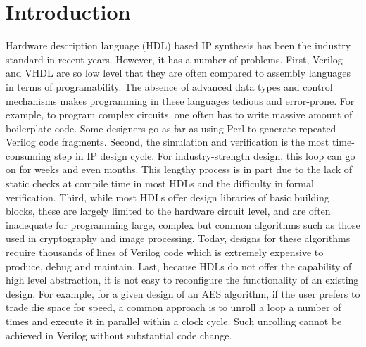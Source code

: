 \section{Introduction}\label{sec:intro}
Hardware description language (HDL)\cite{intro:HDL} based IP synthesis has been the
industry standard in recent years.
However, it has a number of problems.
First, Verilog and VHDL are so low level that they are often compared to assembly languages
in terms of programability. The absence of advanced data types and control mechanisms makes
programming in these languages tedious and error-prone. For example, to program complex
circuits, one often has to write massive amount of boilerplate code. Some
designers go as far as using Perl to generate repeated Verilog code fragments.
Second, the simulation and verification
is the most time-consuming step in IP design cycle. For industry-strength design,
this loop can go on for weeks and even months. This lengthy process is in part due to
the lack of static checks at compile time in most HDLs and the difficulty in formal
verification.  Third, while most HDLs offer design libraries of basic building blocks,
these are largely limited to the hardware circuit level, and are often inadequate for programming
large, complex but common algorithms such as those used in cryptography and image processing.
Today, designs for these algorithms require thousands of lines of Verilog code which is
extremely expensive to produce, debug and maintain. Last, because HDLs do not offer the
capability of high level abstraction, it is not easy to reconfigure the functionality of an
existing design. For example, for a given design of an AES algorithm, if the user prefers
to trade die space for speed, a common approach is to unroll a loop a number of times
and execute it in parallel within a clock cycle. Such unrolling cannot be achieved
in Verilog without substantial code change.

